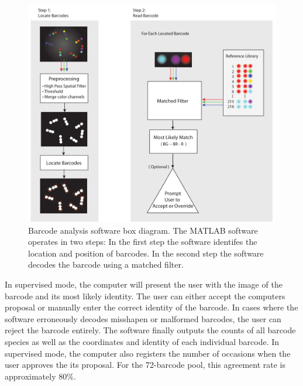 \begin{figure}
\includegraphics[width=\textwidth]{figures/dna_MatlabBlockDiagram}
\caption[Barcode anlaysis software]{
 Barcode analysis software box diagram. The MATLAB software operates in two steps: In the first step the software identifes the
location and position of barcodes. In the second step the software decodes the barcode  using a matched filter. 
\label{fig:dna_MatlabBlockDiagram}}
\end{figure}
\afterpage{\clearpage}


In supervised mode, the computer will present the user with the image of the barcode and its most likely identity. The user can either accept the computers proposal or manually enter the correct identity of the barcode. In cases where the software erroneously decodes misshapen or malformed barcodes, the user can reject the barcode entirely. The software finally outputs the counts of all barcode species as well as the coordinates and identity of each individual barcode. In supervised mode, the computer also registers the number of occasions when the user approves the its proposal. For the 72-barcode pool, this agreement rate is approximately 80\%.

